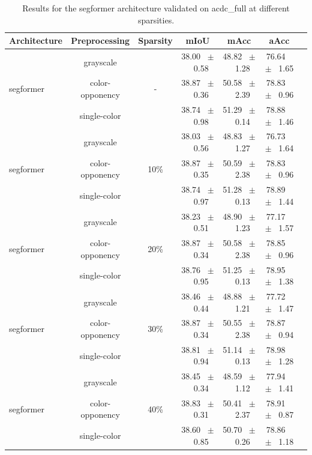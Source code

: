 \begin{table}[h]
  \centering
  \caption{Results for the segformer architecture validated on acdc_full at different sparsities.}
  \begin{tabular}{@{}lccc ccc@{}}
    \toprule
    Architecture & Preprocessing & Sparsity & mIoU & mAcc & aAcc \\
    \midrule

    \multirow{3}{*}{segformer} & grayscale & \multirow{3}{*}{-} & 38.00 ~$\pm$~ 0.58 & 48.82 ~$\pm$~ 1.28 & 76.64 ~$\pm$~ 1.65 \\
    & color-opponency &  & 38.87 ~$\pm$~ 0.36 & 50.58 ~$\pm$~ 2.39 & 78.83 ~$\pm$~ 0.96 \\
    & single-color &  & 38.74 ~$\pm$~ 0.98 & 51.29 ~$\pm$~ 0.14 & 78.88 ~$\pm$~ 1.46 \\
    \midrule
    \multirow{3}{*}{segformer} & grayscale & \multirow{3}{*}{10\%} & 38.03 ~$\pm$~ 0.56 & 48.83 ~$\pm$~ 1.27 & 76.73 ~$\pm$~ 1.64 \\
    & color-opponency &  & 38.87 ~$\pm$~ 0.35 & 50.59 ~$\pm$~ 2.38 & 78.83 ~$\pm$~ 0.96 \\
    & single-color &  & 38.74 ~$\pm$~ 0.97 & 51.28 ~$\pm$~ 0.13 & 78.89 ~$\pm$~ 1.44 \\
    \midrule
    \multirow{3}{*}{segformer} & grayscale & \multirow{3}{*}{20\%} & 38.23 ~$\pm$~ 0.51 & 48.90 ~$\pm$~ 1.23 & 77.17 ~$\pm$~ 1.57 \\
    & color-opponency &  & 38.87 ~$\pm$~ 0.34 & 50.58 ~$\pm$~ 2.38 & 78.85 ~$\pm$~ 0.96 \\
    & single-color &  & 38.76 ~$\pm$~ 0.95 & 51.25 ~$\pm$~ 0.13 & 78.95 ~$\pm$~ 1.38 \\
    \midrule
    \multirow{3}{*}{segformer} & grayscale & \multirow{3}{*}{30\%} & 38.46 ~$\pm$~ 0.44 & 48.88 ~$\pm$~ 1.21 & 77.72 ~$\pm$~ 1.47 \\
    & color-opponency &  & 38.87 ~$\pm$~ 0.34 & 50.55 ~$\pm$~ 2.38 & 78.87 ~$\pm$~ 0.94 \\
    & single-color &  & 38.81 ~$\pm$~ 0.94 & 51.14 ~$\pm$~ 0.13 & 78.98 ~$\pm$~ 1.28 \\
    \midrule
    \multirow{3}{*}{segformer} & grayscale & \multirow{3}{*}{40\%} & 38.45 ~$\pm$~ 0.34 & 48.59 ~$\pm$~ 1.12 & 77.94 ~$\pm$~ 1.41 \\
    & color-opponency &  & 38.83 ~$\pm$~ 0.31 & 50.41 ~$\pm$~ 2.37 & 78.91 ~$\pm$~ 0.87 \\
    & single-color &  & 38.60 ~$\pm$~ 0.85 & 50.70 ~$\pm$~ 0.26 & 78.86 ~$\pm$~ 1.18 \\

\end{tabular}
\end{table}
